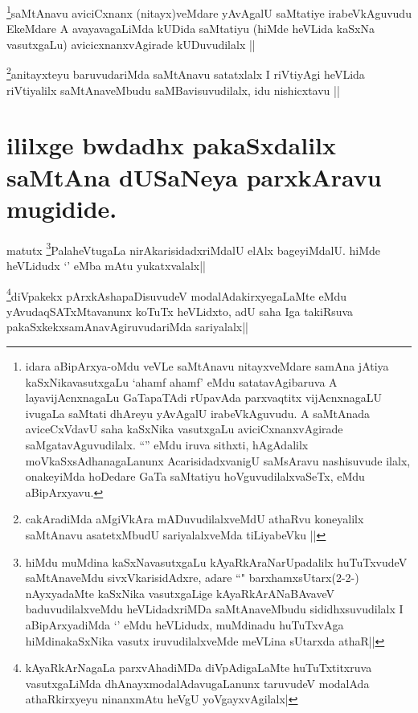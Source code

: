 \begin{artha}
\footnote{idara aBipArxya-oMdu veVLe saMtAnavu nitayxveMdare samAna jAtiya kaSxNikavasutxgaLu `ahamf ahamf' eMdu satatavAgibaruva A layavijAcnxnagaLu GaTapaTAdi rUpavAda parxvaqtitx vijAcnxnagaLU ivugaLa saMtati dhAreyu yAvAgalU irabeVkAguvudu. A saMtAnada aviceCxVdavU saha kaSxNika vasutxgaLu aviciCxnanxvAgirade saMgatavAguvudilalx. ``\stext'' eMdu iruva sithxti, hAgAdalilx moVkaSxsAdhanagaLanunx AcarisidadxvanigU saMsAravu nashisuvude ilalx, onakeyiMda hoDedare GaTa saMtatiyu hoVguvudilalxvaSeTx, eMdu aBipArxyavu.}saMtAnavu aviciCxnanx (nitayx)veMdare yAvAgalU saMtatiye irabeVkAguvudu EkeMdare A avayavagaLiMda kUDida saMtatiyu (hiMde heVLida kaSxNa vasutxgaLu) avicicxnanxvAgirade kUDuvudilalx ||
\end{artha}

\begin{artha}
\footnote{cakAradiMda aMgiVkAra mADuvudilalxveMdU athaRvu koneyalilx saMtAnavu asatetxMbudU sariyalalxveMda tiLiyabeVku ||}anitayxteyu baruvudariMda saMtAnavu satatxlalx I riVtiyAgi heVLida riVtiyalilx saMtAnaveMbudu saMBavisuvudilalx, idu nishicxtavu ||
\end{artha}

\section*{ililxge bwdadhx pakaSxdalilx saMtAna dUSaNeya parxkAravu mugidide.}
\begin{artha}
matutx \footnote{hiMdu muMdina kaSxNavasutxgaLu kAyaRkAraNarUpadalilx huTuTxvudeV saMtAnaveMdu sivxVkarisidAdxre, adare ``\stext" barxhamxsUtarx(2-2-) nAyxyadaMte kaSxNika vasutxgaLige kAyaRkArANaBAvaveV baduvudilalxveMdu heVLidadxriMDa saMtAnaveMbudu sididhxsuvudilalx I aBipArxyadiMda `\stext' eMdu heVLidudx, muMdinadu huTuTxvAga hiMdinakaSxNika vasutx iruvudilalxveMde meVLina sUtarxda athaR||}PalaheVtugaLa nirAkarisidadxriMdalU elAlx bageyiMdalU. hiMde heVLidudx `\stext' eMba mAtu yukatxvalalx||
\end{artha}
\begin{artha}
\footnote{kAyaRkArNagaLa parxvAhadiMDa diVpAdigaLaMte huTuTxtitxruva vasutxgaLiMda dhAnayxmodalAdavugaLanunx taruvudeV modalAda athaRkirxyeyu ninanxmAtu heVgU  yoVgayxvAgilalx|}diVpakekx pArxkAshapaDisuvudeV modalAdakirxyegaLaMte eMdu yAvudaqSATxMtavanunx koTuTx heVLidxto, adU saha Iga takiRsuva pakaSxkekxsamAnavAgiruvudariMda sariyalalx||
\end{artha}

